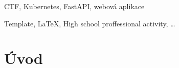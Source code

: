 \documentclass[12pt, a4paper,
twoside,        %
openright
]{report}
\begin{document}
	\vspace{18pt}
	
	
	\noindent CTF, Kubernetes, FastAPI, webová aplikace
	
	\vspace{18pt}

	
	\noindent 

	
	\vspace{18pt}
	
	
	\noindent Template, \LaTeX, High school proffessional activity, \dots 
	
	\clearpage %

	
	\tableofcontents %

	\setcounter{page}{1} %

	\chapter*{Úvod}
\end{document}
